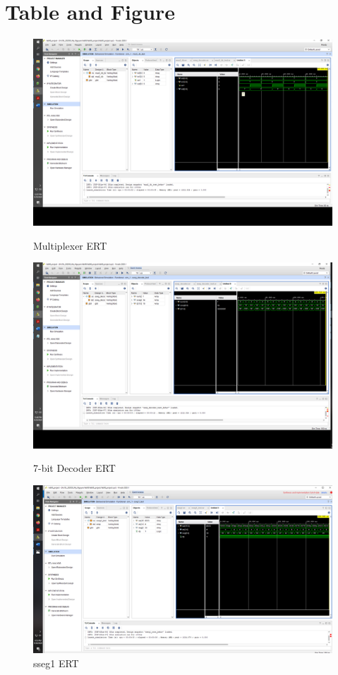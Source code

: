 \documentclass[11pt]{article}
\begin{document}
\section*{Table and Figure}
\begin{figure}[ht]
	\centering
	
	\includegraphics[width=\textwidth,trim=37cm 30cm 1cm 8cm,clip]{"mux2_4b"}
	\caption{Multiplexer ERT}
	\includegraphics[width=\textwidth,trim=35cm 30cm 1cm 8cm,clip]{"decoder"}
	\caption{7-bit Decoder ERT}
	\includegraphics[width=\textwidth,trim=37cm 25cm 1cm 8cm,clip]{"sseg1_test"}
	\caption{sseg1 ERT}
\end{figure}
\end{document}
